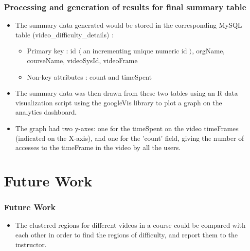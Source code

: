 \documentclass[12pt,xcolor=dvipsnames]{beamer}
\begin{document}

\begin{frame}[t]
\frametitle{Processing and generation of results for final summary table}
\vfill
\begin{itemize}

\item The summary data generated would be stored in the corresponding MySQL table (video\_difficulty\_details) :

\begin{itemize}

\item Primary key : id $\langle$ an incrementing unique numeric id $\rangle$, orgName, courseName, videoSysId, videoFrame
\item Non-key attributes : count and timeSpent

\end{itemize}

\item The summary data was then drawn from these two tables using an R data visualization script using
the googleVis library to plot a graph on the analytics dashboard.
\item The graph had two y-axes: one for the
timeSpent on the video timeFrames (indicated on the X-axis), and one for the ’count’ field, giving the
number of accesses to the timeFrame in the video by all the users.


\end{itemize}
\end{frame}

\section{Future Work}

\begin{frame}[t]
\frametitle{Future Work}

\begin{itemize}

\vspace{70pt}

\item The clustered regions for different videos in a course could be compared with each other in order to find the regions of difficulty, and report them to the instructor.
\end{itemize}

\end{frame}
\end{document}
